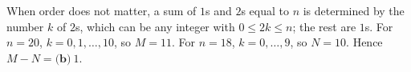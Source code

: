 When order does not matter, a sum of $1$s and $2$s equal to $n$ is determined by the number $k$ of $2$s, which can be any integer with $0\le2k\le n$; the rest are $1$s. For $n=20$, $k=0,1,\dots,10$, so $M=11$. For $n=18$, $k=0,\dots,9$, so $N=10$. Hence $M-N=\boxed{\textbf{(b)}\ 1}$.
